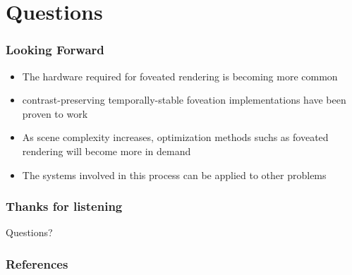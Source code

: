 \documentclass{beamer}
\begin{document}
\fi



\section[Conclusion]{Questions}

\begin{frame}
	\frametitle{Looking Forward}

	\begin{itemize}
		\item The hardware required for foveated rendering is becoming more common
		\item contrast-preserving temporally-stable foveation implementations have been proven to work
		\item As scene complexity increases, optimization methods suchs as foveated rendering will become more in demand
		\item The systems involved in this process can be applied to other problems
	\end{itemize}
	
\end{frame}



\begin{frame}
	\frametitle{Thanks for listening}

	\begin{center}
	{\huge Questions?}
	\end{center}
\end{frame}


\begin{frame}[t,allowframebreaks]
\frametitle{References}

\end{frame}
\end{document}
